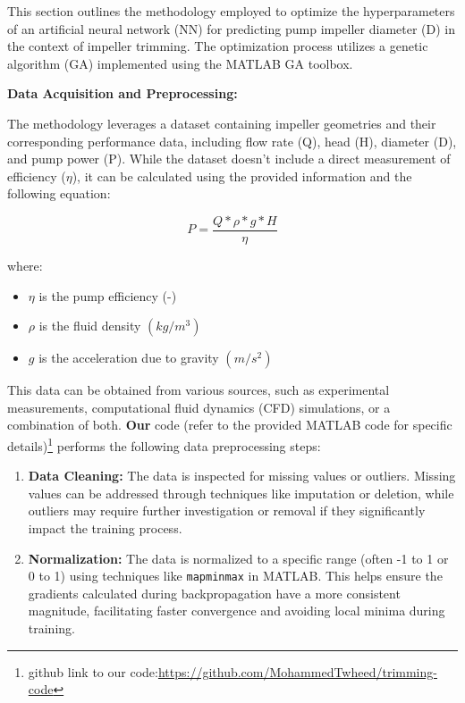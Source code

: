 \documentclass[
  super,
  review,
  3p]{elsarticle}
\providecommand{\tightlist}{%
  \setlength{\itemsep}{0pt}\setlength{\parskip}{0pt}}\usepackage{longtable,booktabs,array}
\begin{document}
This section outlines the methodology employed to optimize the
hyperparameters of an artificial neural network (NN) for predicting pump
impeller diameter (D) in the context of impeller trimming. The
optimization process utilizes a genetic algorithm (GA) implemented using
the MATLAB GA toolbox.

\textbf{Data Acquisition and Preprocessing:}

The methodology leverages a dataset containing impeller geometries and
their corresponding performance data, including flow rate (Q), head (H),
diameter (D), and pump power (P). While the dataset doesn't include a
direct measurement of efficiency (\(\eta\)), it can be calculated using
the provided information and the following equation:

\[
P = \frac{Q*\rho*g*H}{\eta} 
\]

where:

\begin{itemize}
\tightlist
\item
  \(\eta\) is the pump efficiency (-)
\item
  \(\rho\) is the fluid density \((kg/m^3)\)
\item
  \(g\) is the acceleration due to gravity \((m/s^2)\)
\end{itemize}

This data can be obtained from various sources, such as experimental
measurements, computational fluid dynamics (CFD) simulations, or a
combination of both. \textbf{Our} code (refer to the provided MATLAB
code for specific details)\footnote{github link to our
  code:\url{https://github.com/MohammedTwheed/trimming-code}} performs
the following data preprocessing steps:

\begin{enumerate}
\def\labelenumi{\arabic{enumi}.}
\tightlist
\item
  \textbf{Data Cleaning:} The data is inspected for missing values or
  outliers. Missing values can be addressed through techniques like
  imputation or deletion, while outliers may require further
  investigation or removal if they significantly impact the training
  process.
\item
  \textbf{Normalization:} The data is normalized to a specific range
  (often -1 to 1 or 0 to 1) using techniques like \texttt{mapminmax} in
  MATLAB. This helps ensure the gradients calculated during
  backpropagation have a more consistent magnitude, facilitating faster
  convergence and avoiding local minima during training.
\end{enumerate}
\end{document}

